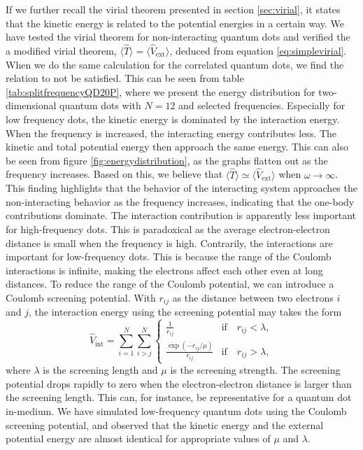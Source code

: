 If we further recall the virial theorem presented in section \ref{sec:virial}, it states that the kinetic energy is related to the potential energies in a certain way. We have tested the virial theorem for non-interacting quantum dots and verified the a modified virial theorem, $\langle\hat{T}\rangle=\langle\hat{V}_{\text{ext}}\rangle$, deduced from equation \eqref{eq:simplevirial}. When we do the same calculation for the correlated quantum dots, we find the relation to not be satisfied. This can be seen from table \eqref{tab:splitfrequencyQD20P}, where we present the energy distribution for two-dimensional quantum dots with $N=12$ and selected frequencies. Especially for low frequency dots, the kinetic energy is dominated by the interaction energy. When the frequency is increased, the interacting energy contributes less. The kinetic and total potential energy then approach the same energy. This can also be seen from figure \eqref{fig:energydistribution}, as the graphs flatten out as the frequency increases. Based on this, we believe that $\langle\hat{T}\rangle\simeq\langle\hat{V}_{\text{ext}}\rangle$ when $\omega\rightarrow\infty$. This finding highlights that the behavior of the interacting system approaches the non-interacting behavior as the frequency increases, indicating that the one-body contributions dominate. The interaction contribution is apparently less important for high-frequency dots. This is paradoxical as the average electron-electron distance is small when the frequency is high. Contrarily, the interactions are important for low-frequency dots. This is because the range of the Coulomb interactions is infinite, making the electrons affect each other even at long distances. To reduce the range of the Coulomb potential, we can introduce a Coulomb screening potential. With $r_{ij}$ as the distance between two electrons $i$ and $j$, the interaction energy using the screening potential may takes the form
\begin{equation}
\hat{V}_{\text{int}}=\sum_{i=1}^N\sum_{i>j}^N
\begin{cases}
\frac{1}{r_{ij}} & \text{if}\quad r_{ij} < \lambda,\\
\frac{\exp(-r_{ij}/\mu)}{r_{ij}} & \text{if}\quad r_{ij} >\lambda,
\end{cases}
\end{equation}
where $\lambda$ is the screening length and $\mu$ is the screening strength. The screening potential drops rapidly to zero when the electron-electron distance is larger than the screening length. This can, for instance, be representative for a quantum dot in-medium. We have simulated low-frequency quantum dots using the Coulomb screening potential, and observed that the kinetic energy and the external potential energy are almost identical for appropriate values of $\mu$ and $\lambda$. 

